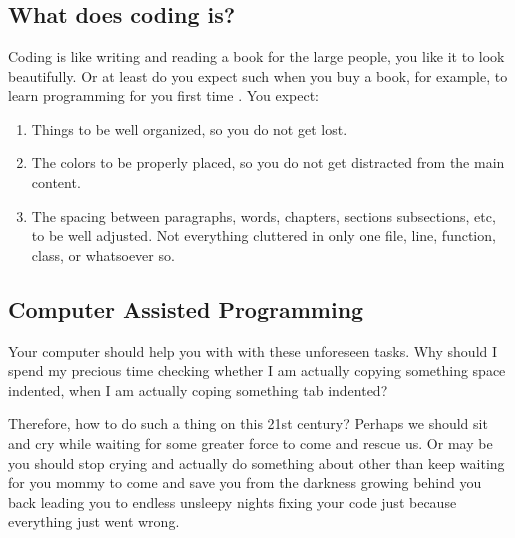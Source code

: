 

%


\chapter{}


    \section{What does coding is?}

    Coding is like writing and reading a book for the large people, you like it
    to look beautifully. Or at least do you expect such when you buy a book, for
    example, to learn programming for you first time \cite{howNovicesRead}.
    You expect:

    \begin{enumerate}
        \item Things to be well organized, so you do not get lost.
        \item The colors to be properly placed, so you do not get distracted
              from the main content.
        \item The spacing between paragraphs, words, chapters, sections
              subsections, etc, to be well adjusted. Not everything cluttered in
              only one file, line, function, class, or whatsoever so.
    \end{enumerate}



    \section{Computer Assisted Programming}

    Your computer should help you with with these unforeseen tasks. Why should I
    spend my precious time checking whether I am actually copying something
    space indented, when I am actually coping something tab indented?

    Therefore, how to do such a thing on this 21\q{}st century? Perhaps we
    should sit and cry while waiting for some greater force to come and rescue
    us. Or may be you should stop crying and actually do something about other
    than keep waiting for you mommy to come and save you from the darkness
    growing behind you back leading you to endless unsleepy nights fixing your
    code just because everything just went wrong.




